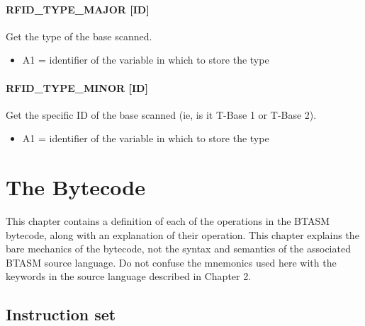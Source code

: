 \documentclass[12pt,a4paper]{scrbook}
\begin{document}
\subsubsection{RFID\_TYPE\_MAJOR [ID]}
Get the type of the base scanned.
\begin{itemize}
\item A1 = identifier of the variable in which to store the type
\end{itemize}

\subsubsection{RFID\_TYPE\_MINOR [ID]}
Get the specific ID of the base scanned (ie, is it T-Base 1 or T-Base 2).
\begin{itemize}
\item A1 = identifier of the variable in which to store the type
\end{itemize}














\chapter{The Bytecode}
This chapter contains a definition of each of the operations in the BTASM bytecode, along with an
explanation of their operation.  This chapter explains the bare mechanics of the bytecode, not
the syntax and semantics of the associated BTASM source language.  Do not confuse the mnemonics
used here with the keywords in the source language described in Chapter 2.

\section{Instruction set}
\end{document}
